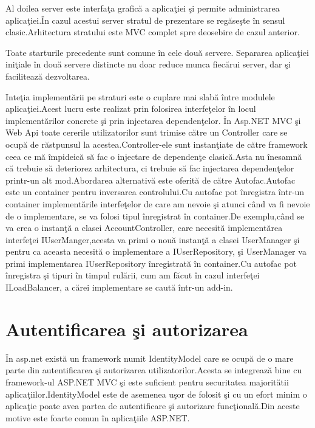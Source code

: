 \documentclass[a4paper,12pt]{report}
\begin{document}
Al doilea server este interfa\c ta grafic\u a a aplica\c tiei \c si permite administrarea aplica\c tiei.\^In cazul 
acestui server stratul de prezentare se reg\u ase\c ste \^in sensul clasic.Arhitectura stratului este MVC complet spre
deosebire de cazul anterior.

Toate starturile precedente sunt comune \^in cele dou\u a servere.
Separarea aplica\c tiei ini\c tiale \^in dou\u a servere distincte nu doar reduce munca fiec\u arui server,
dar \c si faciliteaz\u a dezvoltarea.

Inte\c tia implement\u arii pe straturi este o cuplare mai slab\u a \^intre modulele aplica\c tiei.Acest lucru este 
realizat prin folosirea interfe\c telor \^in locul implement\u arilor concrete \c si prin injectarea dependen\c telor.
\^In Asp.NET MVC \c si Web Api toate cererile utilizatorilor sunt trimise c\u atre un Controller care se ocup\u a de
r\u astpunsul la acestea.Controller-ele sunt instan\c tiate de c\u atre framework ceea ce m\u a \^impideic\u a s\u a 
fac o injectare de dependen\c te clasic\u a.Asta nu \^inesamn\u a c\u a trebuie s\u a deteriorez  arhitectura, ci 
trebuie s\u a fac injectarea dependen\c telor printr-un alt mod.Abordarea alternativ\u a este oferit\u a de c\u atre 
Autofac.Autofac este un container pentru inversarea controlului.Cu autofac pot \^inregistra \^intr-un container 
implement\u arile interfe\c telor de care am nevoie \c si atunci c\^and va fi nevoie de o implementare, se va folosi tipul
\^inregistrat \^in container.De exemplu,c\^and se va crea o instan\c t\u a a clasei AccountController, care necesit\u a 
implement\u area interfe\c tei IUserManger,acesta va primi o nou\u a instan\c t\u a a clasei UserManager \c si pentru ca 
aceasta necesit\u a o implementare a IUserRepository, \c si UserManager va primi implementarea IUserRepository \^inregistrat\u a
\^in container.Cu autofac pot \^inregistra \c si tipuri \^in timpul rul\u arii, cum am f\u acut \^in cazul interfe\c tei 
ILoadBalancer, a c\u arei implementare se caut\u a \^intr-un add-in.

 

\section{Autentificarea \c si autorizarea}

\^In asp.net exist\u a un framework numit IdentityModel care se ocup\u a de o mare parte din autentificarea \c si autorizarea
utilizatorilor.Acesta se integreaz\u a bine cu framework-ul ASP.NET MVC \c si este suficient pentru securitatea majorit\u atii 
aplica\c tiilor.IdentityModel este de asemenea u\c sor de folosit \c si cu un efort minim o aplica\c tie poate avea partea de 
autentificare \c si autorizare func\c tional\u a.Din aceste motive este foarte comun \^in aplica\c tiile ASP.NET.
\end{document}
